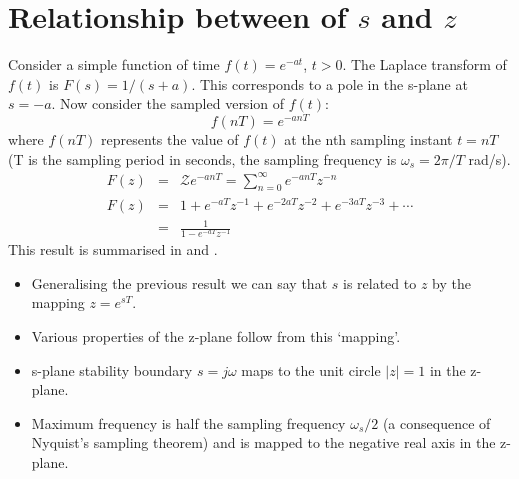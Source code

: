\def\FileDate{10/01/21}
\def\FileVersion{1.0}



\section*{Relationship between of $s$ and $z$}

Consider a simple function of time $f(t)=e^{-at}$, $t>0$. The Laplace transform of $f(t)$ is $F(s)=1/(s+a)$. This corresponds to a pole in the s-plane at $s=-a$. Now consider the sampled version of $f(t)$:
\begin{equation}
  \label{eq:l12e1}
  f(nT) = e^{-anT}
\end{equation}
where $f(nT)$ represents the value of $f(t)$ at the nth sampling instant $t=nT$ (T is the sampling period in seconds, the sampling frequency is $\omega_s=2\pi/T$ rad/s).
\begin{eqnarray}
	F(z) & = & \mathcal{Z}{e^{-anT}}=\sum_{n=0}^{\infty}e^{-anT}z^{-n}\\
	F(z) & = & 1+e^{-aT}z^{-1}+e^{-2aT}z^{-2}+e^{-3aT}z^{-3}+\cdots\\
	&=& \frac{1}{1-e^{-aT}z^{-1}} 	\label{eq:l12e2}
\end{eqnarray}
This result is summarised in  and .
\begin{slide}\label{slide:l12s2}
\begin{itemize}
  \item Generalising the previous result we can say that $s$ is related to $z$ by the mapping $z=e^{sT}.$
  \item Various properties of the z-plane follow from this `mapping'.
  \item s-plane stability boundary $s=j\omega$ maps to the unit circle $|z|=1$ in the z-plane.
  \item Maximum frequency is half the sampling frequency $\omega_s/2$ (a consequence of Nyquist's sampling theorem) and is mapped to the negative real axis in the z-plane.
\end{itemize}
\end{slide}

